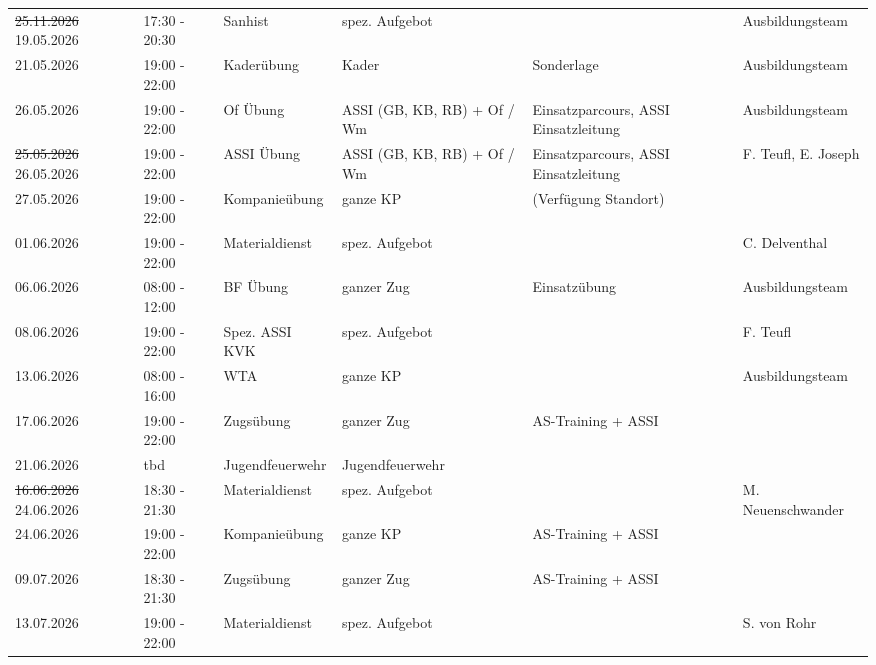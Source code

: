 \documentclass[11pt,a4paper]{article}
\begin{document}
\begin{adjustwidth}{1.5cm}{1.5cm}
\begin{longtable}{llllll}
\color{BrickRed}\sout{25.11.2026} \color{OliveGreen}19.05.2026 & 17:30 - 20:30 & Sanhist & spez. Aufgebot & \color{OliveGreen} & \color{OliveGreen}Ausbildungsteam \\
21.05.2026 & 19:00 - 22:00 & Kader\"ubung & Kader & \color{OliveGreen}Sonderlage & \color{OliveGreen}Ausbildungsteam \\
\color{OliveGreen}26.05.2026 & \color{OliveGreen}19:00 - 22:00 & \color{OliveGreen}Of \"Ubung & \color{OliveGreen}ASSI (GB, KB, RB) + Of / Wm & \color{OliveGreen}Einsatzparcours, ASSI Einsatzleitung  & \color{OliveGreen}Ausbildungsteam \\
\color{BrickRed}\sout{25.05.2026} \color{OliveGreen}26.05.2026 & 19:00 - 22:00 & ASSI \"Ubung & ASSI (GB, KB, RB) + Of / Wm & Einsatzparcours, ASSI Einsatzleitung  & \color{OliveGreen}F. Teufl, E. Joseph \\
27.05.2026 & 19:00 - 22:00 & Kompanie\"ubung & ganze KP & \color{OliveGreen}(Verf\"ugung Standort) & \color{OliveGreen} \\
01.06.2026 & 19:00 - 22:00 & Materialdienst & spez. Aufgebot & \color{OliveGreen} & \color{OliveGreen}C. Delventhal \\
06.06.2026 & 08:00 - 12:00 & BF \"Ubung & ganzer Zug & \color{OliveGreen}Einsatz\"ubung & \color{OliveGreen}Ausbildungsteam \\
08.06.2026 & 19:00 - 22:00 & Spez. ASSI KVK & spez. Aufgebot & \color{OliveGreen} & \color{OliveGreen}F. Teufl \\
13.06.2026 & 08:00 - 16:00 & WTA & ganze KP & \color{OliveGreen} & \color{OliveGreen}Ausbildungsteam \\
17.06.2026 & 19:00 - 22:00 & Zugs\"ubung & ganzer Zug & \color{OliveGreen}AS-Training + ASSI & \color{OliveGreen} \\
\color{OliveGreen}21.06.2026 & \color{OliveGreen}tbd & \color{OliveGreen}Jugendfeuerwehr & \color{OliveGreen}Jugendfeuerwehr & \color{OliveGreen} & \color{OliveGreen} \\
\color{BrickRed}\sout{16.06.2026} \color{OliveGreen}24.06.2026 & 18:30 - 21:30 & Materialdienst & spez. Aufgebot & \color{OliveGreen} & \color{OliveGreen}M. Neuenschwander \\
24.06.2026 & 19:00 - 22:00 & Kompanie\"ubung & ganze KP & \color{OliveGreen}AS-Training + ASSI & \color{OliveGreen} \\
09.07.2026 & 18:30 - 21:30 & Zugs\"ubung & ganzer Zug & \color{OliveGreen}AS-Training + ASSI & \color{OliveGreen} \\
13.07.2026 & 19:00 - 22:00 & Materialdienst & spez. Aufgebot & \color{OliveGreen} & \color{OliveGreen}S. von Rohr \\

\end{longtable}
\end{adjustwidth}
\end{document}
